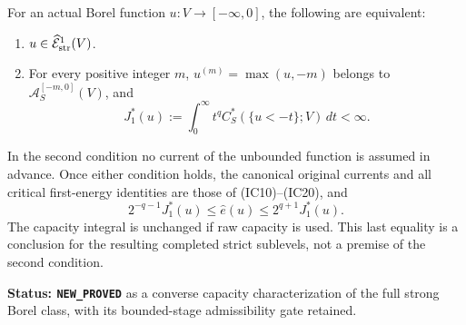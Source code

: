 \begin{theorem}
\label{thm:r11-intrinsic-strong-first-energy}
For an actual Borel function $u:V\to[-\infty,0]$, the following
are equivalent:
\begin{enumerate}
\item $u\in\widehat{\mathcal E}^1_{\rm str}(V)$.
\item For every positive integer $m$,
$u^{(m)}=\max(u,-m)$ belongs to
$\mathcal A_S^{[-m,0]}(V)$, and
\[
                J_1^*(u):=\int_0^\infty
                       t^q C_S^*(\{u<-t\};V)\,dt<\infty.
 \tag{CI2}
\]
\end{enumerate}
In the second condition no current of the unbounded function
is assumed in advance. Once either condition holds, the
canonical original currents and all critical first-energy
identities are those of (IC10)--(IC20), and
\[
       2^{-q-1}J_1^*(u)\leq\widehat e(u)
                                  \leq2^{q+1}J_1^*(u).
 \tag{CI3}
\]
The capacity integral is unchanged if raw capacity is used.
This last equality is a conclusion for the resulting completed
strict sublevels, not a premise of the second condition.
\end{theorem}

\noindent\textbf{Status: \texttt{NEW\_PROVED}} as a converse
capacity characterization of the full strong Borel class,
with its bounded-stage admissibility gate retained.

